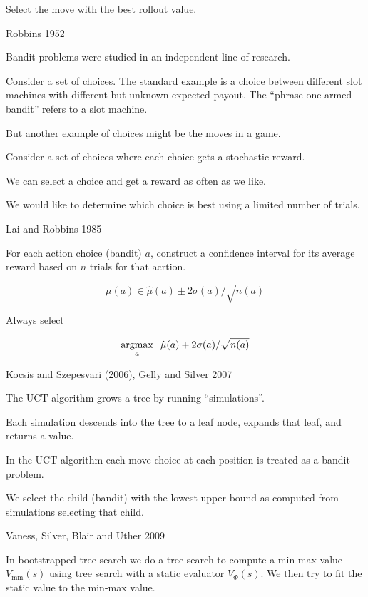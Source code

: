{\vfill
Select the move with the best rollout value.

{Robbins 1952}

Bandit problems were studied in an independent line of research.

\vfill
Consider a set of choices.  The standard example is a choice between different slot machines with different but unknown expected payout.
The ``phrase one-armed bandit'' refers to a slot machine.

\vfill
But another example of choices might be the moves in a game.


\vfill
Consider a set of choices where each choice gets a stochastic reward.

\vfill
We can select a choice and get a reward as often as we like.

\vfill
We would like to determine which choice is best using a limited number of trials.

{Lai and Robbins 1985}

For each action choice (bandit) $a$, construct a confidence interval for its average reward
based on $n$ trials for that acrtion.

\vfill
$$\mu(a) \in \hat{\mu}(a) \pm 2\sigma(a)/\sqrt{n(a)}$$

\vfill
Always select

$$\operatorname*{argmax}_a \;\; \hat{\mu}(a) + 2\sigma(a)/\sqrt{n(a)}$$

{Kocsis and Szepesvari (2006), Gelly and Silver 2007}

The UCT algorithm grows a tree by running ``simulations''.

\vfill
Each simulation descends into the tree to a leaf node, expands that leaf, and returns a value.

\vfill
In the UCT algorithm each move choice at each position is treated as a bandit problem.

\vfill
We select the child (bandit) with the lowest upper bound as computed from simulations selecting that child.


{Vaness, Silver, Blair and Uther 2009}

In bootstrapped tree search we do a tree search to compute a min-max value $V_{\mathrm{mm}}(s)$
using tree search with a static evaluator $V_\Phi(s)$.  We then try to fit the static value to the min-max value.

}
